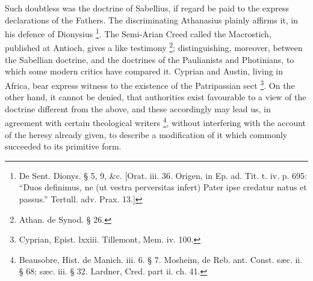 Such doubtless was the doctrine of Sabellius, if regard be paid to
the express declarations of the Fathers. The discriminating Athanasius
plainly affirms it, in his defence of Dionysius \footnote{De Sent. Dionys. § 5, 9, \&c. [Orat.
iii. 36. Origen, in Ep. ad. Tit. t. iv. p. 695: ``Duos definimus,
ne (ut vestra perversitas infert) Pater ipse credatur natus et passus.''
Tertull. adv. Prax. 13.]}. The Semi-Arian Creed called the Macrostich, published at
Antioch, gives a like testimony \footnote{Athan. de Synod. § 26.}; distinguishing, moreover, between the Sabellian
doctrine, and the doctrines of the Paulianists and Photinians, to
which some modern critics have compared it. Cyprian and Austin, living
in Africa, bear express witness to the existence of the Patripassian
sect \footnote{Cyprian, Epist. lxxiii. Tillemont, Mem.
iv. 100.}. On the other
hand, it cannot be denied, that authorities exist favourable to a view
of the doctrine different from the above, and these accordingly may
lead us, in agreement with certain theological writers \footnote{Beausobre, Hist. de Manich. iii. 6. § 7.
Mosheim, de Reb. ant. Const. sæc. ii. § 68; sæc. iii. § 32.
Lardner, Cred. part ii. ch. 41.}, without interfering with the account of the heresy already
given, to describe a modification of it which commonly succeeded to
its primitive form.

